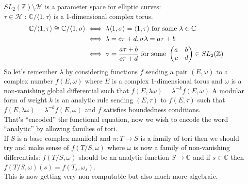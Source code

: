 \documentclass[11pt]{amsart}
\begin{document}
$SL_2(\mathbb Z)\setminus\mathcal H$ is a parameter space for elliptic
curves:\\
$\tau\in\mathcal H$ : $\mathbb C/\langle 1,\tau\rangle$ is a
1-dimensional complex torus.
\begin{align*}
\mathbb C/\langle 1,\tau\rangle\cong \mathbb C/\langle 1,\sigma\rangle 
&\iff \lambda\langle 1,\sigma\rangle = \langle 1,\tau\rangle \text{ for
  some } \lambda\in\mathbb C\\
&\iff \lambda = c\tau + d , \sigma\lambda = a\tau + b\\
&\iff \sigma = {a\tau + b \over c\tau + d} \text{ for some } \begin{pmatrix} a&b \\ c&d \end{pmatrix}  \in SL_2(\mathbb Z)
\end{align*}
So let's remember $\lambda$ by considering functions $f$ sending a
pair $(E,\omega)$ to a complex number $f(E,\omega)$ where $E$ is a
complex 1-dimensional torus and $\omega$ is a non-vanishing global differential
such that $f(E,\lambda\omega) = \lambda^{-k}f(E,\omega)$
A modular form of weight $k$ is an analytic rule sending $(E,\tau)$ to
$f(E,\tau)$ such that $f(E,\lambda\omega) = \lambda^{-k}f(E,\omega)$
and $f$ satisfies boundedness conditions.\\

That's ``encoded'' the functional equation, now we wish to encode the
word ``analytic'' by allowing families of tori.\\

If $S$ is a base complex manifold and $\pi:T\to S$ is a family of tori
then we should try and make sense of $f(T/S,\omega)$ where $\omega$ is
now a family of non-vanishing differentials: $f(T/S,\omega)$ should be
an analytic function $S\to\mathbb C$ and if $s\in\mathbb C$ then
$f(T/S,\omega)(s) = f(T_s,\omega_s)$.\\

This is now getting very non-computable but also much more algebraic.\\
\end{document}
